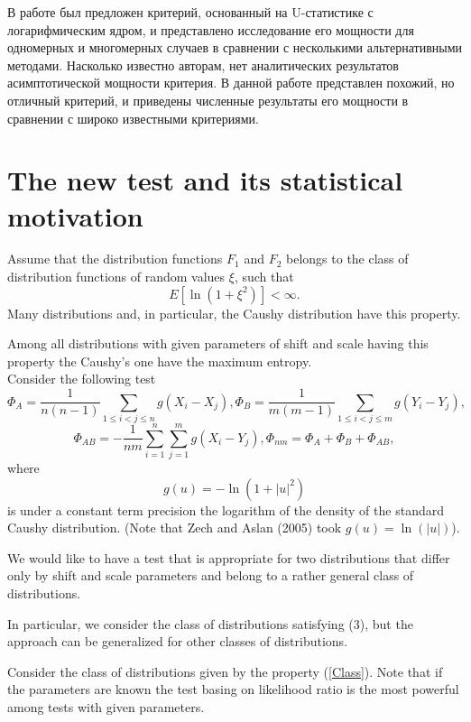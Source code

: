 \documentclass[final,11pt,3p]{elsarticle}
\begin{document}
В работе \cite{AslanZech2005} был предложен критерий, основанный на U-статистике с логарифмическим ядром, и представлено исследование его мощности для одномерных и многомерных случаев в сравнении с несколькими альтернативными методами. Насколько известно авторам, нет аналитических результатов асимптотической мощности критерия. В данной работе представлен похожий, но отличный критерий, и приведены численные результаты его мощности в сравнении с широко известными критериями.

\section{The new test and its statistical motivation}

Assume that the distribution functions
$F_1$ and $F_2$ belongs to the class of distribution functions of random values  $\xi$, such that
\begin {equation}\label{Class}
E [\ln (1+ \xi^2)     ] < \infty.
\end{equation}
Many distributions and, in particular, the Caushy distribution have this property.
 \bigskip

Among all distributions with given parameters of shift and scale having this property the Caushy's one have the maximum entropy.\\


Consider the following test
\begin{equation}
 \Phi_{A}=\frac{1}{n(n-1)}\sum_{1\leq i<j\leq n} g(X_i-X_j),
\Phi_{B}=\frac{1}{m(m-1)}\sum_{1\leq i<j\leq m} g(Y_i-Y_j),
\end{equation}
\begin{equation}\label{K1}
\Phi_{AB}=-\frac{1}{nm}\sum_{i=1}^n\sum_{j=1}^m g(X_i-Y_j),
\Phi_{nm}=\Phi_{A}+ \Phi_{B}+ \Phi_{AB},
\end{equation}
where
$$
g(u)= -\ln (1+|u|^2)
$$
is under a constant term precision the logarithm of the density of the standard Caushy distribution.
(Note that Zech and Aslan (2005) took $g(u)=\ln(|u|)$).



We would like to have a test that is appropriate for two distributions that differ only by shift and scale parameters and belong to a rather general class of distributions.


In particular, we consider the class of distributions satisfying (3), but the approach can be generalized for other classes of distributions.

Consider the class of distributions given by the property (\ref{Class}). Note that if the parameters are known the test basing on likelihood ratio is the most powerful among tests with given parameters.
\end{document}

